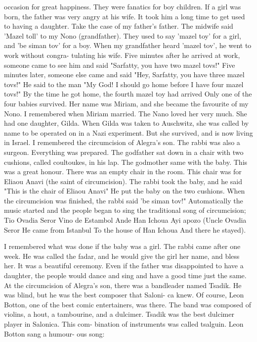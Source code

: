occasion for great happiness. They were fanatics for boy children. If 
a girl was born, the father was very angry at his wife. It took him a 
long time to get used to having a daughter. Take the case of my father's 
father. The midwife said 'Mazel toll' to my Nono (grandfather). 
They used to say 'mazel toy' for a girl, and 'be siman tov' for a boy. 
When my grandfather heard 'mazel tov', he went to work without congra-
tulating his wife. Five minutes after he arrived at work, someone came to see him and said "Sarfatty, you have two mazel tovs!" Five minutes 
later, someone else came and said "Hey, Sarfatty, you have three mazel 
tovs!" He said to the man "My God! I should go home before I have four 
mazel tovs!" By the time he got home, the fourth mazel toy had arrived 
Only one of the four babies survived. Her name was Miriam, and she became the favourite of my Nono. I remembered when Miriam married. The 
Nano loved her very much. She had one daughter, Gilda. When Gilda was 
taken to Auschwitz, she was called by name to be operated on in a Nazi 
experiment. But she survived, and is now living in Israel. 
I remembered the circumcision of Alegra's son. The rabbi was also
a surgeon. Everything was prepared. The godfather sat down in a chair 
with two cushions, called coultoukes, in his lap. The godmother same 
with the baby. This was a great honour. There was an empty chair in 
the room. This chair was for Eliaou Anavi (the saint of circumcision).
The rabbi took the baby, and he said "This is the chair of Eliaou Anavi" 
He put the baby on the two cushions. When the circumcision was finished, the rabbi said 'be siman tov!" Automatically the music started and
the people began to sing the traditional song of circumcision; 
Tio Ovadia Seror 
Vino de Estambol 
Ande Han Ichoua 
Ayi apozo 
(Uncle Ovadia Seror 
He came from Istanbul 
To the house of Han Ichoua 
And there he stayed). 

I remembered what was done if the baby was a girl. The rabbi came 
after one week. He was called the fadar, and he would give the girl her 
name, and bless her. It was a beautiful ceremony. Even if the father  
was disappointed to have a daughter, the people would dance and sing and 
have a good time just the same. 
At the circumcision of Alegra's son, there was a bandleader 
named Tsadik. He was blind, but he was the best composer that Saloni-
ca knew. Of course, Leon Botton, one of the best comic entertainers, 
was there. The band was composed of violins, a hout, a tambourine, and 
a dulcimer. Tsadik was the best dulcimer player in Salonica. This com-
bination of instruments was called tsalguin. Leon Botton sang a humour-
ous song: 

